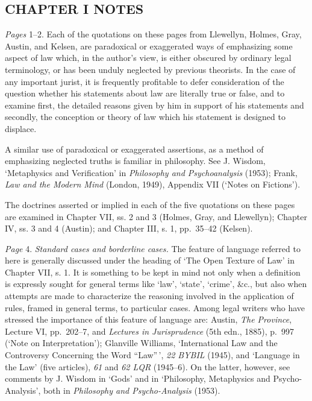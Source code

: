 \subsection{CHAPTER I NOTES}\label{chapter-i-notes}

\small \emph{Pages} 1--2. Each of the quotations on these pages from Llewellyn,
Holmes, Gray, Austin, and Kelsen, are paradoxical or exaggerated ways of
emphasizing some aspect of law which, in the author's view, is either
obscured by ordinary legal terminology, or has been unduly neglected by
previous theorists. In the case of any important jurist, it is
frequently profitable to defer consideration of the question whether his
statements about law are literally true or false, and to examine first,
the detailed reasons given by him in support of his statements and
secondly, the conception or theory of law which his statement is
designed to displace.

A similar use of paradoxical or exaggerated assertions, as a method of
emphasizing neglected truths is familiar in philosophy. See J. Wisdom,
`Metaphysics and Verification' in \emph{Philosophy and Psychoanalysis}
(1953); Frank, \emph{Law and the Modern Mind} (London, 1949), Appendix
VII (`Notes on Fictions').

The doctrines asserted or implied in each of the five quotations on
these pages are examined in Chapter VII, ss. 2 and 3 (Holmes, Gray, and
Llewellyn); Chapter IV, ss. 3 and 4 (Austin); and Chapter III, s. 1,
pp.~35--42 (Kelsen).

\emph{Page} 4. \emph{Standard cases and borderline cases.} The feature
of language referred to here is generally discussed under the heading of
`The Open Texture of Law' in Chapter VII, s. 1. It is something to be
kept in mind not only when a definition is expressly sought for general
terms like `law', `state', `crime', \&c., but also when attempts are
made to characterize the reasoning involved in the application of rules,
framed in general terms, to particular cases. Among legal writers who
have stressed the importance of this feature of language are: Austin,
\emph{The Province}, Lecture VI, pp.~202--7, and \emph{Lectures in
Jurisprudence} (5th edn., 1885), p.~997 (`Note on Interpretation');
Glanville Williams, `International Law and the Controversy Concerning
the Word ``Law''\,', \emph{22 BYBIL} (1945), and `Language in the Law'
(five articles), \emph{61} and \emph{62 LQR} (1945--6). On the latter,
however, see comments by J. Wisdom in `Gods' and in `Philosophy,
Metaphysics and Psycho-Analysis', both in \emph{Philosophy and
Psycho-Analysis} (1953).

